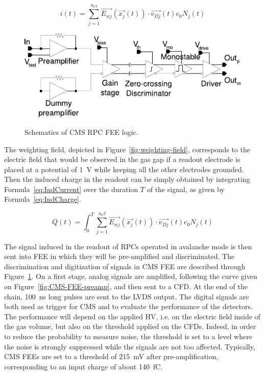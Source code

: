 	\begin{equation}
	\label{eq:IndCurrent}
	i(t) = \sum_{j=1}^{n_{Cl}} \overrightarrow{E_{wj}}(\overrightarrow{x_j}(t)) \cdot \overrightarrow{v_{Dj}}(t) e_0 N_j(t)
	\end{equation}
	
\endgroup
	
\begingroup\setlength{\intextsep}{0pt}\setlength{\columnsep}{15pt}
	
	\begin{figure}
		\centering
		\includegraphics[width = \linewidth]{fig/chapt3/CMS-FEE.pdf}\\
		\caption{\label{fig:CMS-FEE} Schematics of CMS RPC FEE logic.}
	\end{figure}
	
	The weighting field, depicted in Figure~\ref{fig:weighting-field}, corresponds to the electric field that would be observed in the gas gap if a readout electrode is placed at a potential of \SI{1}{V} while keeping all the other electrodes grounded. Then the induced charge in the readout can be simply obtained by integrating Formula~\ref{eq:IndCurrent} over the duration $T$ of the signal, as given by Formula~\ref{eq:IndCharge}.

\endgroup
	
	\begin{equation}
	\label{eq:IndCharge}
	Q(t) = \int_0^T \sum_{j=1}^{n_Cl} \overrightarrow{E_{wj}}(\overrightarrow{x_j}(t)) \cdot \overrightarrow{v_{Dj}}(t) e_0 N_j(t)
	\end{equation}
	
	The signal induced in the readout of RPCs operated in avalanche mode is then sent into \acl{FEE} in which they will be pre-amplified and discriminated. The discrimination and digitization of signals in CMS FEE are described through Figure~\ref{fig:CMS-FEE}. On a first stage, analog signals are amplified, following the curve given on Figure~\ref{fig:CMS-FEE-preamp}, and then sent to a \acf{CFD}. At the end of the chain, \SI{100}{ns} long pulses are sent to the LVDS output. The digital signals are both used as trigger for CMS and to evaluate the performance of the detectors. The performance will depend on the applied HV, i.e. on the electric field inside of the gas volume, but also on the threshold applied on the CFDs. Indeed, in order to reduce the probability to measure noise, the threshold is set to a level where the noise is strongly suppressed while the signals are not too affected. Typically, CMS FEEs are set to a threshold of \SI{215}{mV} after pre-amplification, corresponding to an input charge of about \SI{140}{fC}.
	
